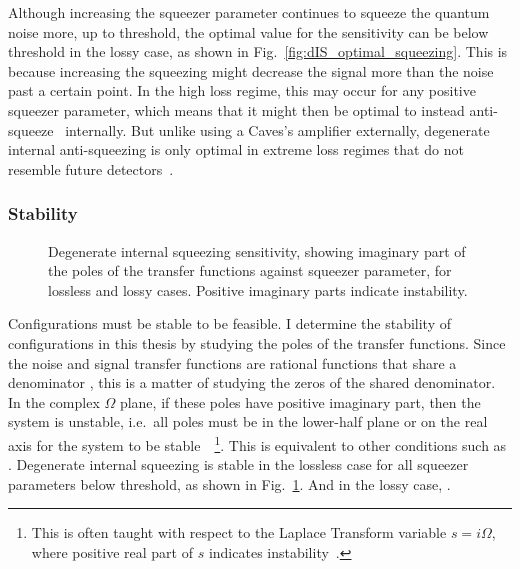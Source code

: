 Although increasing the squeezer parameter continues to squeeze the quantum noise more, up to threshold, the optimal value for the sensitivity can be below threshold in the lossy case, as shown in Fig.~\ref{fig:dIS_optimal_squeezing}. This is because increasing the squeezing might decrease the signal more than the noise past a certain point. In the high loss regime, this may occur for any positive squeezer parameter, which means that it might then be optimal to instead anti-squeeze~\cite{Korobko talk} internally. But unlike using a Caves's amplifier externally, degenerate internal anti-squeezing is only optimal in extreme loss regimes that do not resemble future detectors~\cite{}. 

\subsubsection{Stability}

\begin{figure}
	\centering
	\caption{Degenerate internal squeezing sensitivity, showing imaginary part of the poles of the transfer functions against squeezer parameter, for lossless and lossy cases. Positive imaginary parts indicate instability.}
	\label{fig:dIS_stability}
\end{figure}

Configurations must be stable to be feasible. I determine the stability of configurations in this thesis by studying the poles of the transfer functions. Since the noise and signal transfer functions are rational functions that share a denominator , this is a matter of studying the zeros of the shared denominator. In the complex $\Omega$ plane, if these poles have positive imaginary part, then the system is unstable, i.e.\ all poles must be in the lower-half plane or on the real axis for the system to be stable~\cite{}~\footnote{This is often taught with respect to the Laplace Transform variable $s=i\Omega$, where positive real part of $s$ indicates instability~\cite{}.}. This is equivalent to other conditions such as . Degenerate internal squeezing is stable in the lossless case for all squeezer parameters below threshold, as shown in Fig.~\ref{fig:dIS_stability}. And in the lossy case, .


